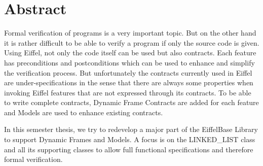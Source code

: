 \chapter*{Abstract}
\label{sec:Abstract}

Formal verification of programs is a very important topic. But on the other hand it is rather difficult to be able to verify a program if only the source code is given. Using Eiffel, not only the code itself can be used but also contracts. Each feature has preconditions and postconditions which can be used to enhance and simplify the verification process. But unfortunately the contracts currently used in Eiffel are under-specifications in the sense that there are always some properties when invoking Eiffel features that are not expressed through its contracts. To be able to write complete contracts, Dynamic Frame Contracts are added for each feature and Models are used to enhance existing contracts.

In this semester thesis, we try to redevelop a major part of the EiffelBase Library to support Dynamic Frames and Models. A focus is on the LINKED\_LIST class and all its supporting classes to allow full functional specifications and therefore formal verification.
